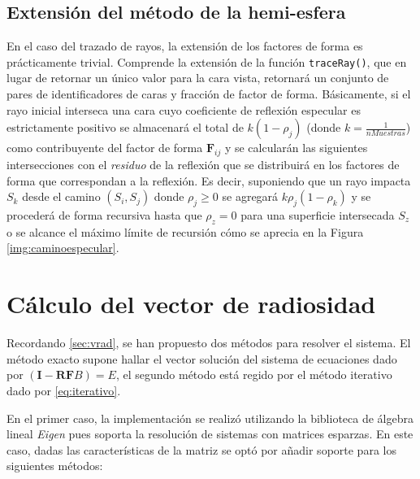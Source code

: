 \subsection{Extensión del método de la hemi-esfera}

En el caso del trazado de rayos, la extensión de los factores de forma es prácticamente trivial. Comprende la extensión de la función \verb|traceRay()|, que en lugar de retornar un único valor para la cara vista, retornará un conjunto de pares de identificadores de caras y fracción de factor de forma. Básicamente, si el rayo inicial interseca una cara cuyo coeficiente de reflexión especular es estrictamente positivo se almacenará el total de $k(1 - \rho_{j})$ (donde $k = \frac{1}{nMuestras}$) como contribuyente del factor de forma $\mathbf{F}_{ij}$ y se calcularán las siguientes intersecciones con el \textit{residuo} de la reflexión que se distribuirá en los factores de forma que correspondan a la reflexión. Es decir, suponiendo que un rayo impacta $S_{k}$ desde el camino $(S_{i}, S_{j})$ donde $\rho_{j} \ge 0$ se agregará $k\rho_{j}(1 - \rho_{k})$ y se procederá de forma recursiva hasta que $\rho_{z} = 0$ para una superficie intersecada $S_{z}$ o se alcance el máximo límite de recursión cómo se aprecia en la Figura \ref{img:caminoespecular}.

\section{Cálculo del vector de radiosidad}

Recordando \ref{sec:vrad}, se han propuesto dos métodos para resolver el sistema. El método exacto supone hallar el vector solución del sistema de ecuaciones dado por $(\mathbf{I - RF}B) = E$, el segundo método está regido por el método iterativo dado por \eqref{eq:iterativo}.

En el primer caso, la implementación se realizó utilizando la biblioteca de álgebra lineal \textit{Eigen} pues soporta la resolución de sistemas con matrices esparzas. En este caso, dadas las características de la matriz se optó por añadir soporte para los siguientes métodos:

